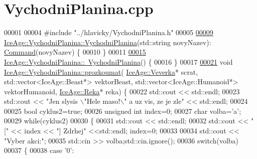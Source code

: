 \hypertarget{VychodniPlanina_8cpp_source}{}\section{Vychodni\+Planina.\+cpp}
\label{VychodniPlanina_8cpp_source}

\begin{DoxyCode}
00001 
00004 \textcolor{preprocessor}{#include "../hlavicky/VychodniPlanina.h"}
00005 
\hypertarget{VychodniPlanina_8cpp_source.tex_l00009}{}\hyperlink{classIceAge_1_1VychodniPlanina_a679da22865d75e93d1631106f5985b54}{00009} \hyperlink{classIceAge_1_1VychodniPlanina_a679da22865d75e93d1631106f5985b54}{IceAge::VychodniPlanina::VychodniPlanina}(std::string novyNazev):
      \hyperlink{classIceAge_1_1Command}{Command}(novyNazev) \{
00010 \}
00011 
\hypertarget{VychodniPlanina_8cpp_source.tex_l00015}{}\hyperlink{classIceAge_1_1VychodniPlanina_ab5893e0634c3c34aaf979c0b4df583f7}{00015} \hyperlink{classIceAge_1_1VychodniPlanina_ab5893e0634c3c34aaf979c0b4df583f7}{IceAge::VychodniPlanina::~VychodniPlanina}() \{
00016 \}
00017 
\hypertarget{VychodniPlanina_8cpp_source.tex_l00021}{}\hyperlink{classIceAge_1_1VychodniPlanina_af101def5e75ce2eb54c221063ee6ffca}{00021} \textcolor{keywordtype}{void} \hyperlink{classIceAge_1_1VychodniPlanina_af101def5e75ce2eb54c221063ee6ffca}{IceAge::VychodniPlanina::prozkoumat}(
      \hyperlink{classIceAge_1_1Veverka}{IceAge::Veverka}* scrat, std::vector<IceAge::Beast*> vektorBeast, 
      std::vector<IceAge::Humanoid*> vektorHumanoid, \hyperlink{classIceAge_1_1Reka}{IceAge::Reka}* reka) \{
00022     std::cout << std::endl;
00023     std::cout << \textcolor{stringliteral}{"Jen slysis \(\backslash\)"Hele maso!\(\backslash\)" a uz vis, ze je zle"} << std::endl;
00024 
00025     \textcolor{keywordtype}{bool} cyklus2=\textcolor{keyword}{true};
00026     \textcolor{keywordtype}{unsigned} \textcolor{keywordtype}{int} index=0;
00027     \textcolor{keywordtype}{char} volba=\textcolor{charliteral}{'a'};
00029     \textcolor{keywordflow}{while}(cyklus2)
00030     \{
00031             std::cout << std::endl;
00032             std::cout << \textcolor{stringliteral}{"["} << index << \textcolor{stringliteral}{"] Zdrhej"} <<std::endl; index=0;
00033 
00034             std::cout << \textcolor{stringliteral}{"Vyber akci:"};
00035             std::cin >> volba;std::cin.ignore();
00036             \textcolor{keywordflow}{switch}(volba)
00037             \{
00038                 \textcolor{keywordflow}{case} \textcolor{charliteral}{'0'}:

\end{DoxyCode}
